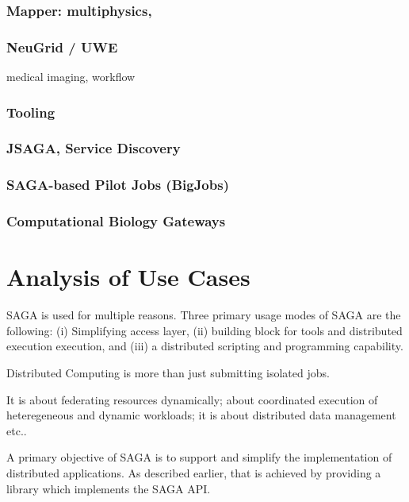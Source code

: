 \documentclass[12pt]{article}
\begin{document}
\subsubsection*{Mapper: multiphysics,}
\subsubsection*{NeuGrid / UWE} medical imaging, workflow

\subsubsection{Tooling}
   \subsubsection*{JSAGA, Service Discovery}
   \subsubsection*{SAGA-based Pilot Jobs (BigJobs)}
   \subsubsection*{Computational Biology Gateways}

\section{Analysis of Use Cases}

SAGA is used for multiple reasons. Three primary usage modes of SAGA
are the following: (i) Simplifying access layer, (ii) building block
for tools and distributed execution execution, and (iii) a distributed
scripting and programming capability.

Distributed Computing is more than just submitting isolated jobs.

It is about federating resources dynamically; about coordinated
execution of heteregeneous and dynamic workloads; it is about
distributed data management etc..

A primary objective of SAGA is to support and simplify the
implementation of distributed applications.  As described earlier,
that is achieved by providing a library which implements the SAGA API.
\end{document}
